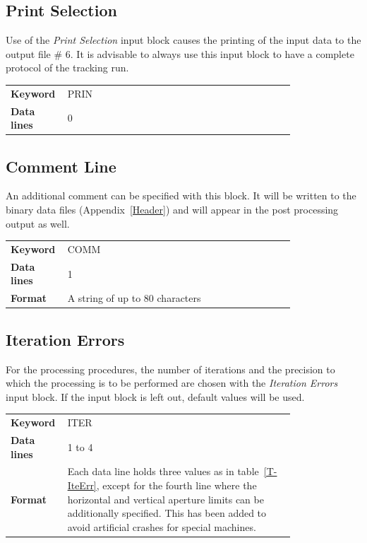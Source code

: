 \subsection{Print Selection} \label{PriSel}

Use of the \textit{Print Selection} input block causes the printing of the input data to the output file \# 6.
It is advisable to always use this input block to have a complete protocol of the tracking run.

\bigskip
\begin{tabular}{@{}lp{0.8\linewidth}}
    \textbf{Keyword}    & PRIN \\
    \textbf{Data lines} & 0
\end{tabular}

\subsection{Comment Line} \label{ComLin}

An additional comment can be specified with this block.
It will be written to the binary data files (Appendix~\ref{Header}) and will appear in the post processing output as well.

\bigskip
\begin{tabular}{@{}lp{0.8\linewidth}}
    \textbf{Keyword}    & COMM \\
    \textbf{Data lines} & 1 \\
    \textbf{Format}     & A string of up to 80 characters
\end{tabular}

\subsection{Iteration Errors} \label{IteErr}

For the processing procedures, the number of iterations and the precision to which the processing is to be performed are chosen with the {\em Iteration Errors} input block.
If the input block is left out, default values will be used.

\bigskip
\begin{tabular}{@{}lp{0.8\linewidth}}
    \textbf{Keyword}    & ITER \\
    \textbf{Data lines} & 1 to 4 \\
    \textbf{Format}     & Each data line holds three values as in table~\ref{T-IteErr}, except for the fourth line where the horizontal and vertical aperture limits can be additionally specified. This has been added to avoid artificial crashes for special machines.
\end{tabular}


